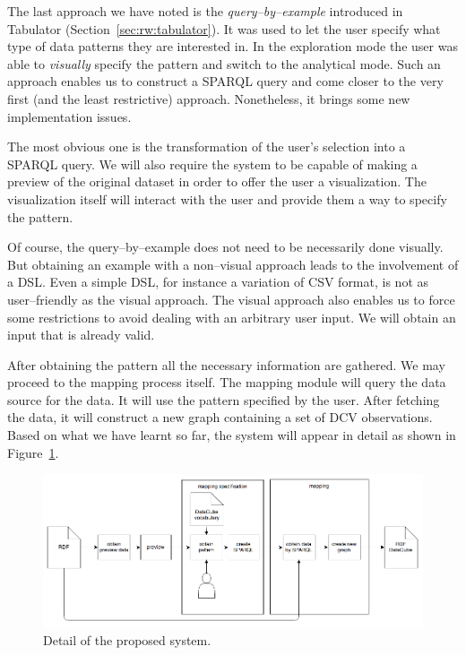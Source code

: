 The last approach we have noted is the \emph{query--by--example} introduced in 
Tabulator (Section~\ref{sec:rw:tabulator}). It was used to let the user specify what type of data patterns they are 
interested in. In the exploration mode the user was able to \emph{visually} 
specify the pattern and switch to the analytical mode. Such an approach enables 
us to construct a SPARQL query and come closer to the very first (and the least restrictive) 
approach. Nonetheless, it brings some new implementation issues.

The most obvious one is the transformation of the user's selection into a SPARQL query. 
We will also require the system to be capable of making a preview of the 
original dataset in order to offer the user a visualization. The visualization 
itself will interact with the user and provide them a way to specify the pattern.

Of course, the query--by--example does not need to be necessarily done visually. But 
obtaining an example with a non--visual approach leads to the involvement of a DSL. Even 
a simple DSL, for instance a variation of CSV format, is not as user--friendly as 
the visual approach. The visual approach also enables us to force some 
restrictions to avoid dealing with an arbitrary user input. We will 
obtain an input that is already valid.

After obtaining the pattern all the necessary information are gathered. We 
may proceed to the mapping process itself. The mapping module will query the 
data source for the data. It will use the pattern specified by the user. After 
fetching the data, it will construct a new graph containing a set of DCV 
observations. Based on what we have learnt so far, the system will appear in detail 
as shown in Figure~\ref{fig:generic-mapping-detail}.

\begin{figure}
	\centering
	\includegraphics[width=140mm]{img/generic-mapping-detail.png}
	\caption{Detail of the proposed system.}
	\label{fig:generic-mapping-detail}
\end{figure}


